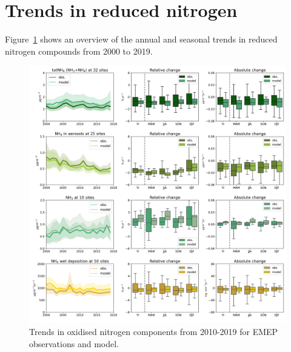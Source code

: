 \section{\label{sec:Trends_reduced nitrogen }Trends in reduced nitrogen}

Figure~\ref{fig:Nred_trends} shows an overview of the annual and seasonal trends in reduced nitrogen compounds from 2000 to 2019.

\begin{figure}
	\centering
	\includegraphics[width=0.74\paperwidth]{FIGS_TRENDS/Nred_trends.png}
	\caption{\label{fig:Nred_trends}Trends in oxidised nitrogen components from 2010-2019 for EMEP observations and model.}
\end{figure}



